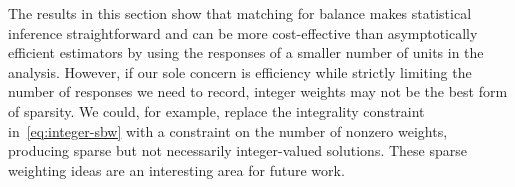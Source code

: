 \documentclass{article}
\theoremstyle{definition}
\newcommand{\hgamma}{\ensuremath{\hat\gamma}}
\newcommand{\<}{\langle}
\renewcommand{\>}{\rangle}
\begin{document}
The results in this section show that matching for balance makes statistical inference straightforward and can be more cost-effective than asymptotically efficient estimators by using the responses of a smaller number of units in the analysis.
However, if our sole concern is efficiency while strictly limiting the number of responses we need to record, integer weights may not be the best form of sparsity.
We could, for example, replace the integrality constraint in~\eqref{eq:integer-sbw} with a constraint on the number of nonzero weights, producing sparse but not necessarily integer-valued solutions. These sparse weighting ideas are an interesting area for future work.




\end{document}
